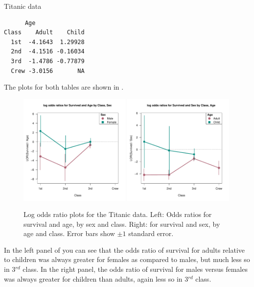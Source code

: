 \documentclass[10pt,krantz2]{krantz}\usepackage[]{graphicx}\usepackage[]{color}
\makeatletter
\newenvironment{kframe}{%
 \def\at@end@of@kframe{}%
 \ifinner\ifhmode%
  \def\at@end@of@kframe{\end{minipage}}%
  \begin{minipage}{\columnwidth}%
 \fi\fi%
 \def\FrameCommand##1{\hskip\@totalleftmargin \hskip-\fboxsep
 \colorbox{shadecolor}{##1}\hskip-\fboxsep
     \hskip-\linewidth \hskip-\@totalleftmargin \hskip\columnwidth}%
 \MakeFramed {\advance\hsize-\width
   \@totalleftmargin\z@ \linewidth\hsize
   \@setminipage}}%
 {\par\unskip\endMakeFramed%
 \at@end@of@kframe}
\newenvironment{knitrout}{}{} %
\renewenvironment{knitrout}{\small\renewcommand{\baselinestretch}{.85}}{} %
\makeatother
\begin{document}
\begin{Example}{Titanic data}
\begin{knitrout}
\begin{kframe}
\begin{verbatim}
      Age
Class    Adult    Child
  1st  -4.1643  1.29928
  2nd  -4.1516 -0.16034
  3rd  -1.4786 -0.77879
  Crew -3.0156       NA
\end{verbatim}
\end{kframe}
\end{knitrout}
The plots for both tables are shown in .
\begin{knitrout}
\color{fgcolor}\begin{figure}[!htbp]

\centerline{\includegraphics[width=0.49\textwidth]{ch05/fig/titanic-lor-plot-1} 
\includegraphics[width=0.49\textwidth]{ch05/fig/titanic-lor-plot-2} }

\caption[Log odds ratio plots for the Titanic data.]{Log odds ratio plots for the Titanic data. Left: Odds ratios for survival and age, by sex and class. Right: for survival and sex, by age and class. Error bars show $\pm 1$ standard error.\label{fig:titanic-lor-plot}}
\end{figure}


\end{knitrout}
In the left panel of  you can see that the odds ratio of
survival for adults relative to children was always greater for females as compared
to males, but much less so in 3$^{rd}$ class.
In the right panel, the odds ratio of survival for males versus females was always
greater for children than adults, again less so in 3$^{rd}$ class.
\end{Example}
\end{document}
